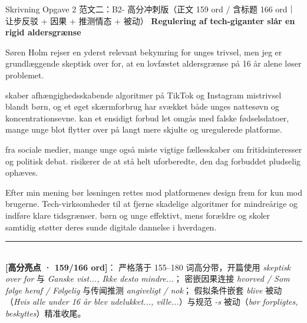 \begin{emailbox}{Skrivning Opgave 2 范文二：B2- 高分冲刺版（正文 159 ord / 含标题 166 ord｜让步反驳 + 因果 + 推测情态 + 被动）}
\textbf{\color{NCDNavy}Regulering af tech-giganter slår en rigid aldersgrænse}

\vspace{0.25em}
Søren Holm rejser en yderst relevant bekymring for unges trivsel, men jeg er grundlæggende skeptisk over for, at en lovfæstet aldersgrænse på 16 år alene løser problemet.

\vspace{0.25em}
 skaber afhængighedsskabende algoritmer på TikTok og Instagram mistrivsel blandt børn, og et øget skærmforbrug har  svækket både unges nattesøvn og koncentrationsevne.  kan et ensidigt forbud let omgås med falske fødselsdatoer,  mange unge blot flytter over på langt mere skjulte og uregulerede platforme.

\vspace{0.25em}
 fra sociale medier,  mange unge  også miste vigtige fællesskaber om fritidsinteresser og politisk debat.  risikerer de at stå helt uforberedte, den dag forbuddet pludselig ophæves.

\vspace{0.25em}
Efter min mening bør løsningen rettes mod platformenes design frem for kun mod brugerne. Tech-virksomheder  til at fjerne skadelige algoritmer for mindreårige og indføre klare tidsgrænser.   børn og unge effektivt, mens forældre og skoler samtidig støtter deres sunde digitale dannelse i hverdagen.

\vspace{0.3em}
\rule{\linewidth}{0.4pt}\\[0.2em]
\small\textbf{\color{NCDNavy}[高分亮点 · 159/166 ord]}： 严格落于 155--180 词高分带，开篇使用 \textit{skeptisk over for} 与 \textit{Ganske vist..., Ikke desto mindre...}； 密嵌因果连接 \textit{hvorved / Som følge heraf / Følgelig} 与传闻推测 \textit{angiveligt / nok}； 假拟条件嵌套 \textit{blive} 被动（\textit{Hvis alle under 16 år blev udelukket..., ville...}）与规范 \textit{-s} 被动（\textit{bør forpligtes, beskyttes}）精准收尾。
\end{emailbox}

